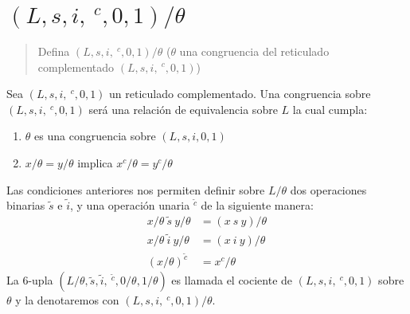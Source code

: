 \documentclass{article}
\begin{document}
\section{$(L,s,i,\ ^c,0,1)/\theta$}
\begin{quote}
    Defina $(L,s,i,\ ^c,0,1)/\theta$ ($\theta$ una congruencia del reticulado complementado $(L,s,i,\ ^c,0,1)$)
\end{quote}
Sea $(L,s,i,\ ^c,0,1)$ un reticulado complementado. Una congruencia sobre $(L,s,i,\ ^c,0,1)$ será una relación de equivalencia sobre $L$ la cual cumpla:
\begin{enumerate}
    \item $\theta$ es una congruencia sobre $(L,s,i,0,1)$
    \item $x/\theta=y/\theta$ implica $x^c/\theta=y^c/\theta$
\end{enumerate}
Las condiciones anteriores nos permiten definir sobre $L/\theta$ dos operaciones binarias $\tilde{s}$ e $\tilde{i}$, y una operación unaria $^{\tilde{c}}$ de la siguiente manera:
\begin{equation*}
    \begin{aligned}
        x/\theta\ \tilde{s}\ y/\theta & = (x\ s\ y)/\theta \\
        x/\theta\ \tilde{i}\ y/\theta & = (x\ i\ y)/\theta \\
        (x/\theta)^{\tilde{c}}        & = x^c/\theta
    \end{aligned}
\end{equation*}
La $6$-upla $(L/\theta,\tilde{s},\tilde{i},\ ^{\tilde{c}},0/\theta,1/\theta)$ es llamada el cociente de $(L,s,i,\ ^c,0,1)$ sobre $\theta$ y la denotaremos con $(L,s,i,\ ^c,0,1)/\theta$.
\end{document}
